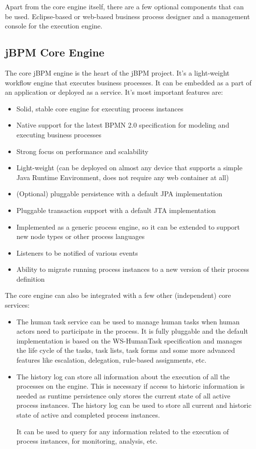	Apart from the core engine itself, there are a few optional components that can be used. Eclipse-based or web-based
	business process designer and a management console for the execution engine.

	\subsection{jBPM Core Engine}
	
	The core jBPM engine is the heart of the jBPM project. It's a light-weight workflow engine that executes business
	processes.
	It can be embedded as a part of an application or deployed as a service. It's most important features are:
	
	\begin{itemize}
	  \item Solid, stable core engine for executing process instances
	  \item Native support for the latest BPMN 2.0 specification for modeling and executing business processes
	  \item Strong focus on performance and scalability
	  \item Light-weight (can be deployed on almost any device that supports a simple Java Runtime Environment, does not
	  require any web container at all)
	  \item (Optional) pluggable persistence with a default JPA implementation
	  \item Pluggable transaction support with a default JTA implementation
	  \item Implemented as a generic process engine, so it can be extended to support new node types or other process
	  languages
	  \item Listeners to be notified of various events
	  \item Ability to migrate running process instances to a new version of their process definition
	\end{itemize}

	The core engine can also be integrated with a few other (independent) core services:
	
	\begin{itemize}
	  \item The human task service can be used to manage human tasks when human actors need to participate in the process.
	  It is fully pluggable and the default implementation is based on the WS-HumanTask specification and manages the life
	  cycle of the tasks, task lists, task forms and some more advanced features like escalation, delegation, rule-based
	  assignments, etc.
	  \item The history log can store all information about the execution of all the processes on the engine. This is
	  necessary if access to historic information is needed as runtime persistence only stores the current state of all
	  active process instances. The history log can be used to store all current and historic state of active and completed
	  process instances.
	  
	  It can be used to query for any information related to the execution of process instances, for
	  monitoring, analysis, etc.
	\end{itemize}
